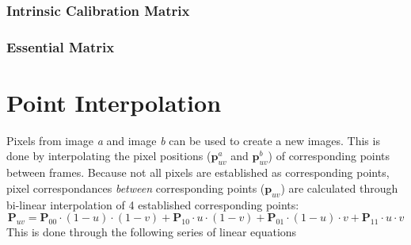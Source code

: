 \documentclass{report}
\begin{document}
\subsection*{Intrinsic Calibration Matrix}

\subsection*{Essential Matrix}

%

\chapter{Point Interpolation}
\par
Pixels from image \textit{a} and image \textit{b} can be used to create a new images. This is done by interpolating the pixel positions ($\mathbf{p}^{a}_{uv}$ and $\mathbf{p}^{b}_{uv}$) of corresponding points between frames. Because not all pixels are established as corresponding points, pixel correspondances \textit{between} corresponding points ($\mathbf{p}_{uv}$) are calculated through bi-linear interpolation of 4 established corresponding points: 
\begin{equation*}
\mathbf{P}_{uv} = 
\mathbf{P}_{00}\cdot (1-u)\cdot (1-v)+\mathbf{P}_{10}\cdot u \cdot (1-v)+
\mathbf{P}_{01}\cdot (1-u)\cdot v +\mathbf{P}_{11}\cdot u \cdot v
\end{equation*}
This is done through the following series of linear equations
\end{document}
